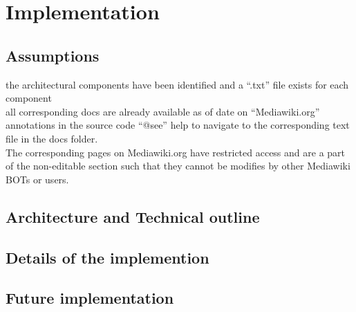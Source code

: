 \chapter{Implementation}\label{chapter:Implementation}

\section{Assumptions}
\indent the architectural components have been identified and a \enquote{.txt} file exists for each component
\\\indent all corresponding docs are already available as of date on  \enquote{Mediawiki.org}
\\\indent annotations in the source code \enquote{@see} help to navigate to the corresponding text file in the docs folder.
\\\indent The corresponding pages on Mediawiki.org have restricted access and are a part of the non-editable section such that they cannot be modifies by other Mediawiki BOTs or users.
\section{Architecture and Technical outline}
\section{Details of the implemention}

\section{Future implementation}

		

